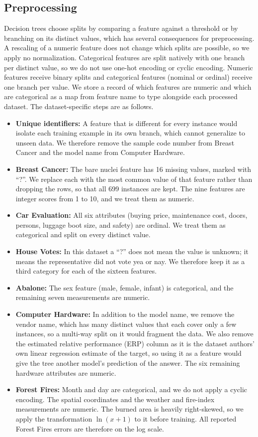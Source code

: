 \documentclass[twoside,11pt]{article}
\begin{document}
\subsection{Preprocessing}
Decision trees choose splits by comparing a feature against a threshold or by branching on its distinct values, which has several consequences for preprocessing. A rescaling of a numeric feature does not change which splits are possible, so we apply no normalization. Categorical features are split natively with one branch per distinct value, so we do not use one-hot encoding or cyclic encoding. Numeric features receive binary splits and categorical features (nominal or ordinal) receive one branch per value. We store a record of which features are numeric and which are categorical as a map from feature name to type alongside each processed dataset. The dataset-specific steps are as follows.
\begin{itemize}
    \item \textbf{Unique identifiers:} A feature that is different for every instance would isolate each training example in its own branch, which cannot generalize to unseen data. We therefore remove the sample code number from Breast Cancer and the model name from Computer Hardware.
    \item \textbf{Breast Cancer:} The bare nuclei feature has 16 missing values, marked with ``?''. We replace each with the most common value of that feature rather than dropping the rows, so that all 699 instances are kept. The nine features are integer scores from 1 to 10, and we treat them as numeric.
    \item \textbf{Car Evaluation:} All six attributes (buying price, maintenance cost, doors, persons, luggage boot size, and safety) are ordinal. We treat them as categorical and split on every distinct value.
    \item \textbf{House Votes:} In this dataset a ``?'' does not mean the value is unknown; it means the representative did not vote yea or nay. We therefore keep it as a third category for each of the sixteen features.
    \item \textbf{Abalone:} The sex feature (male, female, infant) is categorical, and the remaining seven measurements are numeric.
    \item \textbf{Computer Hardware:} In addition to the model name, we remove the vendor name, which has many distinct values that each cover only a few instances, so a multi-way split on it would fragment the data. We also remove the estimated relative performance (ERP) column as it is the dataset authors' own linear regression estimate of the target, so using it as a feature would give the tree another model's prediction of the answer. The six remaining hardware attributes are numeric.
    \item \textbf{Forest Fires:} Month and day are categorical, and we do not apply a cyclic encoding. The spatial coordinates and the weather and fire-index measurements are numeric. The burned area is heavily right-skewed, so we apply the transformation $\ln(x+1)$ to it before training. All reported Forest Fires errors are therefore on the log scale.
\end{itemize}
\end{document}
